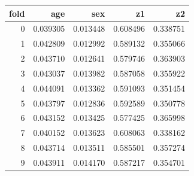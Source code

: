 \begin{tabular}{rrrrr}
\toprule
fold & age & sex & z1 & z2 \\
\midrule
0 & 0.039305 & 0.013448 & 0.608496 & 0.338751 \\
1 & 0.042809 & 0.012992 & 0.589132 & 0.355066 \\
2 & 0.043710 & 0.012641 & 0.579746 & 0.363903 \\
3 & 0.043037 & 0.013982 & 0.587058 & 0.355922 \\
4 & 0.044091 & 0.013362 & 0.591093 & 0.351454 \\
5 & 0.043797 & 0.012836 & 0.592589 & 0.350778 \\
6 & 0.043152 & 0.013425 & 0.577425 & 0.365998 \\
7 & 0.040152 & 0.013623 & 0.608063 & 0.338162 \\
8 & 0.043714 & 0.013511 & 0.585501 & 0.357274 \\
9 & 0.043911 & 0.014170 & 0.587217 & 0.354701 \\
\bottomrule
\end{tabular}
